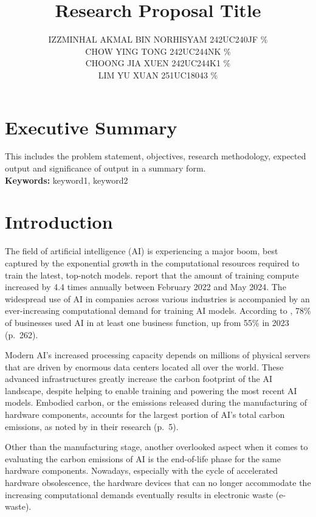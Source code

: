\documentclass[a4paper, 12pt]{article}
\author{
IZZMINHAL AKMAL BIN NORHISYAM \quad 242UC240JF \quad 25\% \\
CHOW YING TONG \quad 242UC244NK \quad 25\% \\
CHOONG JIA XUEN \quad 242UC244K1 \quad 25\% \\
LIM YU XUAN \quad 251UC18043 \quad 25\% \\
}
\title{ Research Proposal Title  }
\begin{document}
\maketitle

\section*{Executive Summary}
This includes the problem statement, objectives, research methodology, expected output and significance of output in a summary form. 
\hfill
\\
\textbf{Keywords:} keyword1, keyword2 \\

\section{Introduction}
The field of artificial intelligence (AI) is experiencing a major boom, best captured by the exponential growth in the computational resources required to train the latest, top-notch models. \citet{Sevilla_Roldan_2024} report that the amount of training compute increased by 4.4 times annually between February 2022 and May 2024. The widespread use of AI in companies across various industries is accompanied by an ever-increasing computational demand for training AI models. According to \citet{Maslej2025}, 78\% of businesses used AI in at least one business function, up from 55\% in 2023 (p.~262).

\par Modern AI's increased processing capacity depends on millions of physical servers that are driven by enormous data centers located all over the world.  These advanced infrastructures greatly increase the carbon footprint of the AI landscape, despite helping to enable training and powering the most recent AI models.  Embodied carbon, or the emissions released during the manufacturing of hardware components, accounts for the largest portion of AI's total carbon emissions, as noted by \citet{Wu2022} in their research (p.~5).

\par Other than the manufacturing stage, another overlooked aspect when it comes to evaluating the carbon emissions of AI is the end-of-life phase for the same hardware components. Nowadays, especially with the cycle of accelerated hardware obsolescence, the hardware devices that can no longer accommodate the increasing computational demands eventually results in electronic waste (e-waste). 
\end{document}
